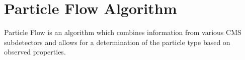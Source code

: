 \section{Particle Flow Algorithm}\label{sec:ch3:PFlow}

Particle Flow is an algorithm which combines information from various CMS subdetectors and allows for a determination of the particle type based on observed properties.